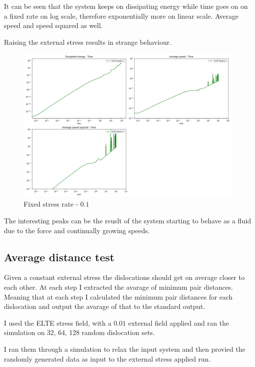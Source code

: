 \documentclass[12pt,a4paper]{article}
\theoremstyle{plain}
\begin{document}
\begin{multicols*}{2}
	\par It can be seen that the system keeps on dissipating energy while time goes on
	on a fixed rate on log scale, therefore exponentially more on linear scale. Average
	speed and speed squared as well.

	\par Raising the external stress results in strange behaviour.

	\begin{figure}[H]
		\centering
		\includegraphics[width=0.95\columnwidth]{all_elte_fixed_0_1.png}
		\caption{Fixed stress rate - $0.1$}
	\end{figure}

	\par The interesting peaks can be the reuslt of the system starting to behave
	as a fluid due to the force and continually growing speeds.

	\subsection{Average distance test}

	\par Given a constant external stress the dislocations should get on average closer
	to each other. At each step I extracted the avarage of minimum pair distances. Meaning that at each step
	I calculated the minimum pair distances for each dislocation and output the avarage of that to
	the standard output.

	\par I used the ELTE stress field, with a $0.01$ external field applied and ran
	the simulation on 32, 64, 128 random dislocation sets.

	\par I ran them through a simulation to relax the input system and then provied the randomly
	generated data as input to the external stress applied run.


\end{multicols*}
\end{document}
